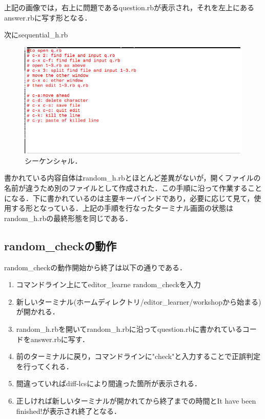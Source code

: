 \documentclass[11pt,dvipdfmx]{jsarticle}
\providecommand{\tightlist}{%
      \setlength{\itemsep}{0pt}\setlength{\parskip}{0pt}}
\begin{document}
上記の画像では，右上に問題であるquestion.rbが表示され，それを左上にあるanswer.rbに写す形となる．

次にsequential\_h.rb

\begin{figure}[H]
\centering
\begin{center}
\includegraphics[width=150mm]{../../picture/sequential_h.png}
\end{center}
\caption{シーケンシャル．\label{sqquential}}

\label{fig:}
\end{figure}

書かれている内容自体はrandom\_h.rbとほとんど差異がないが，開くファイルの名前が違うため別のファイルとして作成された．この手順に沿って作業することになる．下に書かれているのは主要キーバインドであり，必要に応じて見て，使用する形となっている．上記の手順を行なったターミナル画面の状態はrandom\_h.rbの最終形態を同じである．

    \subsection{random\_checkの動作}\label{random_checkux306eux52d5ux4f5c}

random\_checkの動作開始から終了は以下の通りである．

\begin{enumerate}
\def\labelenumi{\arabic{enumi}.}
\tightlist
\item
  コマンドライン上にてeditor\_learne random\_checkを入力
\item
  新しいターミナル(ホームディレクトリ/editor\_learner/workshopから始まる)が開かれる．
\item
  random\_h.rbを開いてrandom\_h.rbに沿ってquestion.rbに書かれているコードをanswer.rbに写す．
\item
  前のターミナルに戻り，コマンドラインに"check"と入力することで正誤判定を行ってくれる．
\item
  間違っていればdiff-lcsにより間違った箇所が表示される．
\item
  正しければ新しいターミナルが開かれてから終了までの時間とIt have been
  finished!が表示され終了となる．
\end{enumerate}
\end{document}
